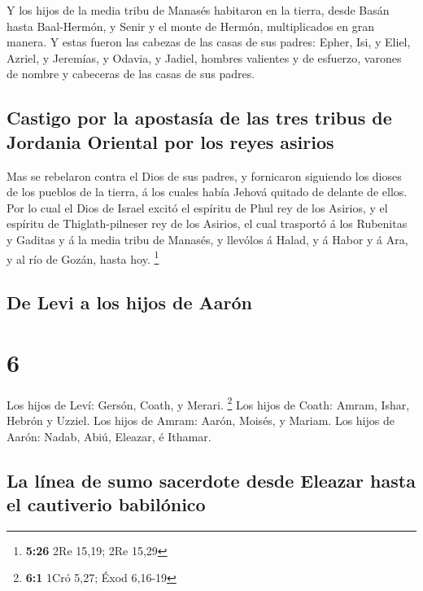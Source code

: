  Y los hijos de la media tribu de Manasés habitaron en la
tierra, desde Basán hasta Baal-Hermón, y Senir y el monte de Hermón,
multiplicados en gran manera.  Y estas fueron las cabezas
de las casas de sus padres: Epher, Isi, y Eliel, Azriel, y Jeremías, y
Odavia, y Jadiel, hombres valientes y de esfuerzo, varones de nombre y
cabeceras de las casas de sus padres.

\hypertarget{castigo-por-la-apostasuxeda-de-las-tres-tribus-de-jordania-oriental-por-los-reyes-asirios}{%
\subsection{Castigo por la apostasía de las tres tribus de Jordania
Oriental por los reyes
asirios}\label{castigo-por-la-apostasuxeda-de-las-tres-tribus-de-jordania-oriental-por-los-reyes-asirios}}

 Mas se rebelaron contra el Dios de sus padres, y
fornicaron siguiendo los dioses de los pueblos de la tierra, á los
cuales había Jehová quitado de delante de ellos.  Por lo
cual el Dios de Israel excitó el espíritu de Phul rey de los Asirios, y
el espíritu de Thiglath-pilneser rey de los Asirios, el cual trasportó á
los Rubenitas y Gaditas y á la media tribu de Manasés, y llevólos á
Halad, y á Habor y á Ara, y al río de Gozán, hasta hoy. \footnote{\textbf{5:26}
  2Re 15,19; 2Re 15,29}

\hypertarget{de-levi-a-los-hijos-de-aaruxf3n}{%
\subsection{De Levi a los hijos de
Aarón}\label{de-levi-a-los-hijos-de-aaruxf3n}}

\hypertarget{section-5}{%
\section{6}\label{section-5}}

 Los hijos de Leví: Gersón, Coath, y Merari. \footnote{\textbf{6:1}
  1Cró 5,27; Éxod 6,16-19}  Los hijos de Coath: Amram,
Ishar, Hebrón y Uzziel.  Los hijos de Amram: Aarón, Moisés,
y Mariam. Los hijos de Aarón: Nadab, Abiú, Eleazar, é Ithamar.

\hypertarget{la-luxednea-de-sumo-sacerdote-desde-eleazar-hasta-el-cautiverio-babiluxf3nico}{%
\subsection{La línea de sumo sacerdote desde Eleazar hasta el cautiverio
babilónico}\label{la-luxednea-de-sumo-sacerdote-desde-eleazar-hasta-el-cautiverio-babiluxf3nico}}

